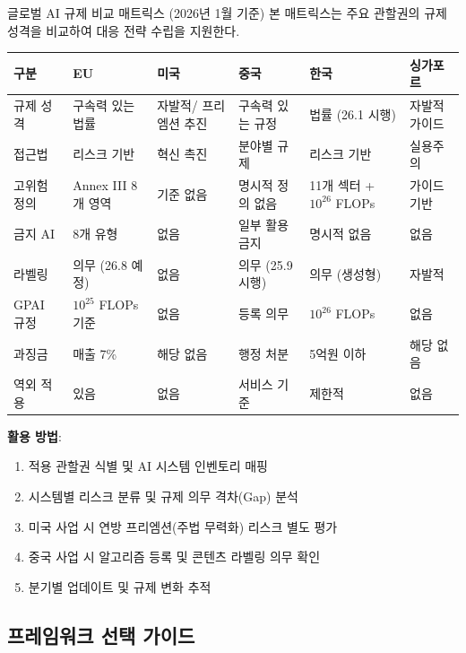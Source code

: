 \begin{practicaltool}{글로벌 AI 규제 비교 매트릭스 (2026년 1월 기준)}
본 매트릭스는 주요 관할권의 규제 성격을 비교하여 대응 전략 수립을 지원한다.

\begin{center}
\renewcommand{\arraystretch}{1.3}
\small
\begin{tabularx}{\textwidth}{p{1.8cm}p{2.2cm}p{2.2cm}p{2.2cm}p{2.2cm}p{2.2cm}}
\toprule
\textbf{구분} & \textbf{EU} & \textbf{미국} & \textbf{중국} & \textbf{한국} & \textbf{싱가포르} \\
\midrule
규제 성격 & 구속력 있는 법률 & 자발적/ 프리엠션 추진 & 구속력 있는 규정 & 법률 (26.1 시행) & 자발적 가이드 \\
\midrule
접근법 & 리스크 기반 & 혁신 촉진 & 분야별 규제 & 리스크 기반 & 실용주의 \\
\midrule
고위험 정의 & Annex III 8개 영역 & 기준 없음 & 명시적 정의 없음 & 11개 섹터 + $10^{26}$ FLOPs & 가이드 기반 \\
\midrule
금지 AI & 8개 유형 & 없음 & 일부 활용 금지 & 명시적 없음 & 없음 \\
\midrule
라벨링 & 의무 (26.8 예정) & 없음 & 의무 (25.9 시행) & 의무 (생성형) & 자발적 \\
\midrule
GPAI 규정 & $10^{25}$ FLOPs 기준 & 없음 & 등록 의무 & $10^{26}$ FLOPs & 없음 \\
\midrule
과징금 & 매출 7\% & 해당 없음 & 행정 처분 & 5억원 이하 & 해당 없음 \\
\midrule
역외 적용 & 있음 & 없음 & 서비스 기준 & 제한적 & 없음 \\
\bottomrule
\end{tabularx}
\end{center}
\vspace{0.2cm}
\textbf{활용 방법}:
\begin{enumerate}
 \item 적용 관할권 식별 및 AI 시스템 인벤토리 매핑
 \item 시스템별 리스크 분류 및 규제 의무 격차(Gap) 분석
 \item 미국 사업 시 연방 프리엠션(주법 무력화) 리스크 별도 평가
 \item 중국 사업 시 알고리즘 등록 및 콘텐츠 라벨링 의무 확인
 \item 분기별 업데이트 및 규제 변화 추적
\end{enumerate}
\end{practicaltool}

\subsection{프레임워크 선택 가이드}


